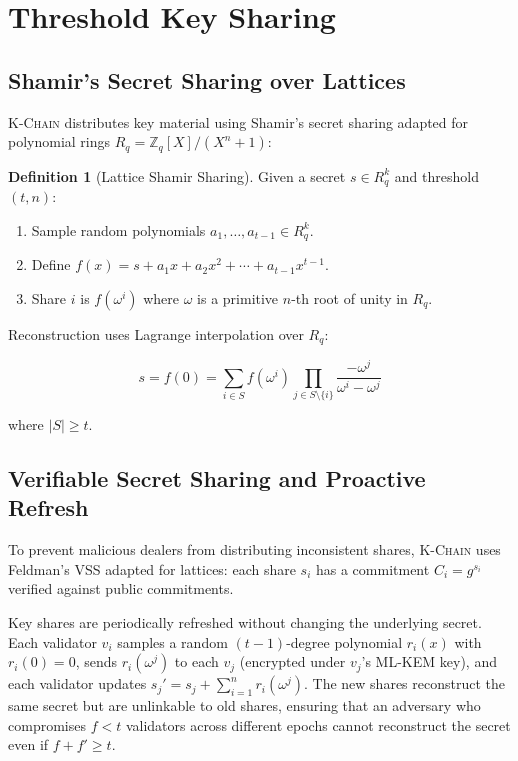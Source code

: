 \documentclass[11pt,letterpaper]{article}
\theoremstyle{definition}
\newtheorem{definition}{Definition}
\theoremstyle{remark}
\newcommand{\KChain}{\textsc{K-Chain}}
\begin{document}
\section{Threshold Key Sharing}

\subsection{Shamir's Secret Sharing over Lattices}

\KChain{} distributes key material using Shamir's secret sharing adapted for polynomial rings $R_q = \mathbb{Z}_q[X]/(X^n + 1)$:

\begin{definition}[Lattice Shamir Sharing]
Given a secret $s \in R_q^k$ and threshold $(t, n)$:
\begin{enumerate}
\item Sample random polynomials $a_1, \ldots, a_{t-1} \in R_q^k$.
\item Define $f(x) = s + a_1 x + a_2 x^2 + \cdots + a_{t-1} x^{t-1}$.
\item Share $i$ is $f(\omega^i)$ where $\omega$ is a primitive $n$-th root of unity in $R_q$.
\end{enumerate}
\end{definition}

Reconstruction uses Lagrange interpolation over $R_q$:

\begin{equation}
s = f(0) = \sum_{i \in S} f(\omega^i) \prod_{j \in S \setminus \{i\}} \frac{-\omega^j}{\omega^i - \omega^j}
\end{equation}

where $|S| \geq t$.

\subsection{Verifiable Secret Sharing and Proactive Refresh}

To prevent malicious dealers from distributing inconsistent shares, \KChain{} uses Feldman's VSS \cite{feldman1987practical} adapted for lattices: each share $s_i$ has a commitment $C_i = g^{s_i}$ verified against public commitments.

Key shares are periodically refreshed without changing the underlying secret. Each validator $v_i$ samples a random $(t-1)$-degree polynomial $r_i(x)$ with $r_i(0) = 0$, sends $r_i(\omega^j)$ to each $v_j$ (encrypted under $v_j$'s ML-KEM key), and each validator updates $s_j' = s_j + \sum_{i=1}^{n} r_i(\omega^j)$. The new shares reconstruct the same secret but are unlinkable to old shares, ensuring that an adversary who compromises $f < t$ validators across different epochs cannot reconstruct the secret even if $f + f' \geq t$.
\end{document}
